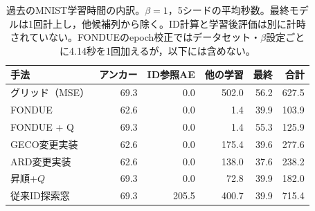 \documentclass[11pt,a4paper]{ltjsarticle}
\begin{document}
\begin{table}[H]
\caption{過去のMNIST学習時間の内訳。$\beta=1$，5シードの平均秒数。最終モデルは1回計上し，他候補列から除く。ID計算と学習後評価は別に計時されていない。FONDUEのepoch校正ではデータセット・$\beta$設定ごとに4.14秒を1回加えるが，以下には含めない。}\label{tab:cost}
\footnotesize
\setlength{\tabcolsep}{3.5pt}
\begin{tabular*}{\textwidth}{@{\extracolsep{\fill}}lrrrrr@{}}
\toprule
手法 & アンカー & ID参照AE & 他の学習 & 最終 & 合計 \\
\midrule
グリッド（MSE） & 69.3 & 0.0 & 502.0 & 56.2 & 627.5 \\
FONDUE & 62.6 & 0.0 & 1.4 & 39.9 & 103.9 \\
FONDUE + Q & 69.3 & 0.0 & 1.4 & 55.3 & 125.9 \\
GECO変更実装 & 62.6 & 0.0 & 175.4 & 39.6 & 277.6 \\
ARD変更実装 & 62.6 & 0.0 & 138.0 & 37.6 & 238.2 \\
昇順+$Q$ & 69.3 & 0.0 & 72.8 & 39.9 & 182.0 \\
従来ID探索窓 & 69.3 & 205.5 & 400.7 & 39.9 & 715.4 \\
\bottomrule
\end{tabular*}
\end{table}
\end{document}
